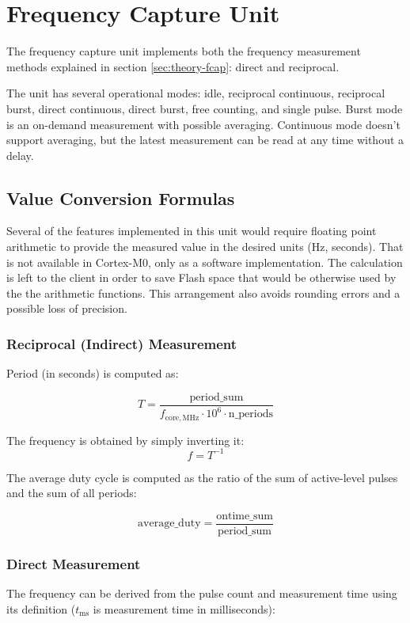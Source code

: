 
\section{Frequency Capture Unit}

The frequency capture unit implements both the frequency measurement methods explained in section \ref{sec:theory-fcap}: direct and reciprocal.

The unit has several operational modes: idle, reciprocal continuous, reciprocal burst, direct continuous, direct burst, free counting, and single pulse. Burst mode is an on-demand measurement with possible averaging. Continuous mode doesn't support averaging, but the latest measurement can be read at any time without a delay.

\subsection{Value Conversion Formulas}

Several of the features implemented in this unit would require floating point arithmetic to provide the measured value in the desired units (Hz, seconds). That is not available in Cortex-M0, only as a software implementation. The calculation is left to the client in order to save Flash space that would be otherwise used by the the arithmetic functions. This arrangement also avoids rounding errors and a possible loss of precision.

\subsubsection{Reciprocal (Indirect) Measurement}

Period (in seconds) is computed as:

\[
	T = \dfrac{\mathrm{period\_sum}}{f_\mathrm{core,MHz} \cdot 10^6 \cdot \mathrm{n\_periods}}
\]

\noindent
The frequency is obtained by simply inverting it: \[f=T^{-1}\]

The average duty cycle is computed as the ratio of the sum of active-level pulses and the sum of all periods:

\[\mathrm{average\_duty} = \dfrac{\mathrm{ontime\_sum}}{\mathrm{period\_sum}}\]

\subsubsection{Direct Measurement}

The frequency can be derived from the pulse count and measurement time using its definition ($t_\mathrm{ms}$ is measurement time in milliseconds):

